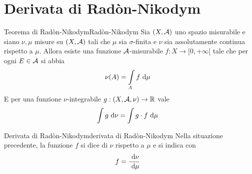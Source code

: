 \documentclass{article}
\begin{document}
\section{Derivata di Radòn-Nikodym}

\begin{theorem}{Teorema di Radòn-Nikodym}{Radòn-Nikodym}
    Sia $(X,\mathcal{A})$ uno spazio misurabile e siano $\nu, \mu$ misure su $(X,\mathcal{A})$ tali che $\mu$ sia $\sigma$-finita e $\nu$ sia assolutamente continua rispetto a $\mu$. Allora esiste una funzione $\mathcal{A}$-misurabile $f: X \to [0,+\infty[$ tale che per ogni $E \in \mathcal{A}$ si abbia
    \[\nu(A) = \int\limits_A f \text{ d} \mu \]
    E per una funzione $\nu$-integrabile $g : (X,\mathcal{A},\nu)\to \mathbb{R}$ vale
    \[\int\limits g \text{ d} \nu = \int\limits g \cdot f \text{ d} \mu\]
\end{theorem}
\begin{definition}{Derivata di Radòn-Nikodym}{derivata di Radòn-Nikodym}
    Nella situazione precedente, la funzione $f$ si dice  di $\nu$ rispetto a $\mu$ e si indica con
    \[f = \frac{\text{ d} \nu}{\text{ d} \mu}\]
\end{definition}

\end{document}
